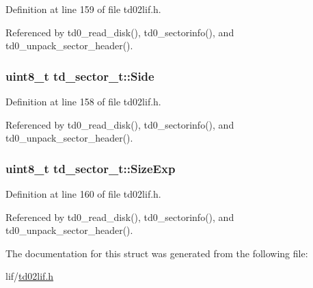 Definition at line 159 of file td02lif.\+h.



Referenced by td0\+\_\+read\+\_\+disk(), td0\+\_\+sectorinfo(), and td0\+\_\+unpack\+\_\+sector\+\_\+header().

\subsubsection[{\texorpdfstring{Side}{Side}}]{\setlength{\rightskip}{0pt plus 5cm}uint8\+\_\+t td\+\_\+sector\+\_\+t\+::\+Side}\hypertarget{structtd__sector__t_ae8f05b8d6e903e618f6adec8973221f7}{}\label{structtd__sector__t_ae8f05b8d6e903e618f6adec8973221f7}


Definition at line 158 of file td02lif.\+h.



Referenced by td0\+\_\+read\+\_\+disk(), td0\+\_\+sectorinfo(), and td0\+\_\+unpack\+\_\+sector\+\_\+header().

\subsubsection[{\texorpdfstring{Size\+Exp}{SizeExp}}]{\setlength{\rightskip}{0pt plus 5cm}uint8\+\_\+t td\+\_\+sector\+\_\+t\+::\+Size\+Exp}\hypertarget{structtd__sector__t_addc6d434740a76aebde544a9beab1b6b}{}\label{structtd__sector__t_addc6d434740a76aebde544a9beab1b6b}


Definition at line 160 of file td02lif.\+h.



Referenced by td0\+\_\+read\+\_\+disk(), td0\+\_\+sectorinfo(), and td0\+\_\+unpack\+\_\+sector\+\_\+header().



The documentation for this struct was generated from the following file\+:\begin{DoxyCompactItemize}
\item 
lif/\hyperlink{td02lif_8h}{td02lif.\+h}\end{DoxyCompactItemize}

